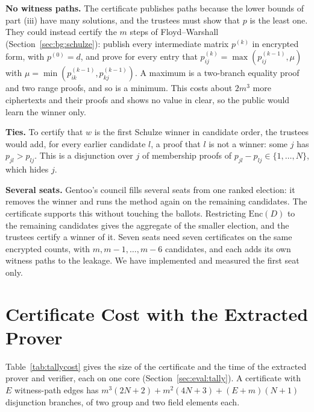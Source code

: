 \textbf{No witness paths.} The certificate publishes paths because the
lower bounds of part (iii) have many solutions, and the trustees must
show that $p$ is the least one. They could instead certify the $m$ steps
of Floyd--Warshall (Section~\ref{sec:bg:schulze}): publish every
intermediate matrix $p^{(k)}$ in encrypted form, with $p^{(0)} = d$, and
prove for every entry that $p^{(k)}_{ij} = \max(p^{(k-1)}_{ij}, \mu)$
with $\mu = \min(p^{(k-1)}_{ik}, p^{(k-1)}_{kj})$. A maximum is a
two-branch equality proof and two range proofs, and so is a minimum.
This costs about $2m^3$ more ciphertexts and their proofs and shows no
value in clear, so the public would learn the winner only.

\textbf{Ties.} To certify that $w$ is the first Schulze winner in
candidate order, the trustees would add, for every earlier candidate
$l$, a proof that $l$ is not a winner: some $j$ has $p_{jl} > p_{lj}$.
This is a disjunction over $j$ of membership proofs of $p_{jl} - p_{lj}
\in \{1, \ldots, N\}$, which hides $j$.

\textbf{Several seats.} Gentoo's council fills several seats from one
ranked election: it removes the winner and runs the method again on the
remaining candidates. The certificate supports this without touching the
ballots. Restricting $\mathrm{Enc}(D)$ to the remaining candidates gives
the aggregate of the smaller election, and the trustees certify a winner
of it. Seven seats need seven certificates on the same encrypted counts,
with $m, m-1, \ldots, m-6$ candidates, and each adds its own witness
paths to the leakage. We have implemented and measured the first seat
only.

\section{Certificate Cost with the Extracted Prover}\label{app:onecore}
Table~\ref{tab:tallycost} gives the size of the certificate and the
time of the extracted prover and verifier, each on one core
(Section~\ref{sec:eval:tally}). A certificate with $E$ witness-path
edges has $m^3(2N+2) + m^2(4N+3) + (E+m)(N+1)$ disjunction branches, of
two group and two field elements each.

